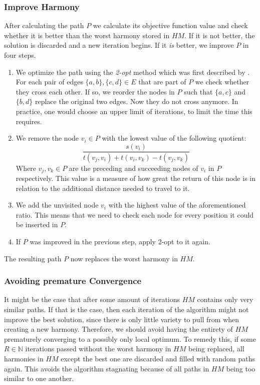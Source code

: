 \subsubsection{Improve Harmony}
\label{subsubsec:04:createharmony}

After calculating the path $P$ we calculate its objective function value and check whether it is better than the worst harmony stored in $HM$.
If it is not better, the solution is discarded and a new iteration begins.
If it \emph{is} better, we improve $P$ in four steps.

\begin{enumerate}
	\item We optimize the path using the \emph{2-opt} method which was first described by \citeauthor{croes_method_1958}. \cite{croes_method_1958}
	      For each pair of edges $\{a,b\}, \{c, d\} \in E$ that are part of $P$ we check whether they cross each other.
	      If so, we reorder the nodes in $P$ such that $\{a, c\}$ and $\{b, d\}$ replace the original two edges. Now they do not cross anymore. In practice, one would choose an upper limit of iterations, to limit the time this requires.
	\item We remove the node $v_i \in P$ with the lowest value of the following quotient:
	      \begin{equation*}
		      \frac{s(v_i)}{t(v_j, v_i) + t(v_i, v_k) - t(v_j, v_k)}
	      \end{equation*}
	      Where $v_j, v_k \in P$ are the preceding and succeeding nodes of $v_i$ in $P$ respectively.
	      This value is a measure of how great the return of this node is in relation to the additional distance needed to travel to it.
	\item We add the unvisited node $v_i$ with the highest value of the aforementioned ratio.
	      This means that we need to check each node for every position it could be inserted in $P$.
	\item If $P$ was improved in the previous step, apply 2-opt to it again.
\end{enumerate}

The resulting path $P$ now replaces the worst harmony in $HM$.

\subsubsection{Avoiding premature Convergence}

It might be the case that after some amount of iterations $HM$ contains only very similar paths.
If that is the case, then each iteration of the algorithm might not improve the best solution, since there is only little variety to pull from when creating a new harmony.
Therefore, we should avoid having the entirety of $HM$ prematurely converging to a possibly only local optimum.
To remedy this, if some $R \in \mathbb{N}$ iterations passed without the worst harmony in $HM$ being replaced,
all harmonies in $HM$ except the best one are discarded and filled with random paths again.
This avoids the algorithm stagnating because of all paths in $HM$ being too similar to one another.
